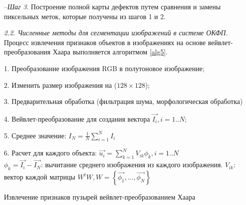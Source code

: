 --\textit{Шаг 3}. Построение полной карты дефектов путем сравнения и замены пиксельных меток, которые получены из шагов 1 и 2.


\textit{2.2. Численные методы для сегментации изображений в системе ОКФП.} Процесс извлечения признаков объектов в изображениях на основе вейвлет-преобразования Хаара выполняется алгоритмом \ref{alg5}.%
%
%
%
%
%
%
%

\begin{algorithm}[ht!]
		1. Преобразование изображения RGB в полутоновое изображение;

		2. Изменить размер изображения на ($128 \times 128$);

		3. Предварительная обработка (фильтрация шума, морфологическая обработка)

		4. Вейвлет-преобразование для создания вектора $\vec{I_i}, i=1..N$;

		5. Среднее значение: $I_N=\frac{1}{N}\sum_{i=1}^N I_i$

		6. Расчет для каждого объекта: $\vec{u_i}=\sum_{k=1}^N V_{ik} \phi_k, i=1..N$\\
		$\phi_k=\vec{I_i}-\vec{I_N}$: вычитание среднего изображения из каждого изображения.
			$V_{ik}$: вектор каждой матрицы $W^tW, W=\left\{\vec{\phi_1},...,\vec{\phi_N}\right\} $
  \caption{Извлечение признаков пузырей вейвлет-преобразованием Хаара}\label{alg5}
\end{algorithm}

